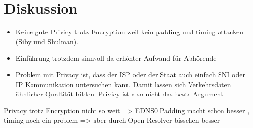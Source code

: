 \chapter{Diskussion}


\begin{draft}
    \begin{itemize}
        \item Keine gute Privicy trotz Encryption weil kein padding und timing attacken (Siby und Shulman). 
        \item Einführung trotzdem sinnvoll da erhöhter Aufwand für Abhörende 
        \item Problem mit Privacy ist, dass der ISP oder der Staat auch einfach SNI oder IP Kommunikation untersuchen kann. Damit lassen sich Verkehrsdaten ähnlicher Qualtität bilden. Privicy ist also nicht das beste Argument.
    \end{itemize}

    Privacy trotz Encryption nicht so weit \cite{Shulman2014} \cite{Siby2018} => EDNS0 Padding macht schon besser \cite{rfc7830}, timing noch ein problem => aber durch Open Resolver bisschen besser\cite{Shulman2014}
\end{draft}
